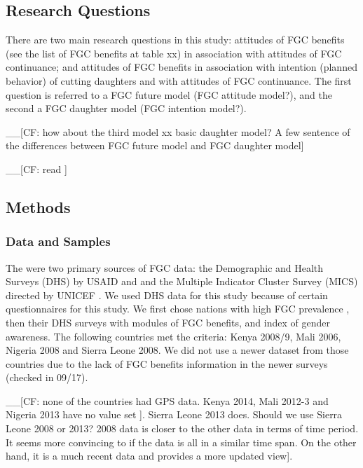 \documentclass[12pt,]{article}
\begin{document}
\subsection{Research Questions}\label{research-questions}
There are two main research questions in this study:  attitudes of FGC benefits (see the list of FGC benefits at table xx) in association with attitudes of FGC continuance; and attitudes of FGC benefits in association with intention (planned behavior) of cutting daughters and with attitudes of FGC continuance.  The first question is referred to a FGC future model (FGC attitude model?), and the second a FGC daughter model (FGC intention model?). 

\_\_{[}CF: how about the third model xx basic daughter model?  A few sentence of the differences between FGC future model and FGC daughter model{]}

\_\_{[}CF: read \cite{Aske05, Brue05}{]}

\subsection{Methods}\label{methods}

\subsubsection{Data and Samples}\label{data-and-samples}

The were two primary sources of FGC data: the Demographic and Health Surveys (DHS) by USAID and and the Multiple Indicator Cluster Survey (MICS) directed by UNICEF \cite{CappMone13, YodeWang13}. We used DHS data for this study because of certain questionnaires for this study.  We first chose nations with high FGC prevalence \cite{UNIC16}, then their DHS surveys with modules of FGC benefits, and index of gender awareness.  The following countries met the criteria:  Kenya 2008/9, Mali 2006, Nigeria 2008 and Sierra Leone 2008.  We did not use a newer dataset from those countries due to the lack of FGC benefits information in the newer surveys (checked in 09/17).

\_\_{[}CF: none of the countries had GPS data.  Kenya 2014, Mali 2012-3 and Nigeria 2013 have no value set {]}.  Sierra Leone 2013 does.  Should we use Sierra Leone 2008 or 2013? 2008 data is closer to the other data in terms of time period. It seems more convincing to if the data is all in a similar time span.  On the other hand, it is a much recent data and provides a more updated view{]}. 
\end{document}
